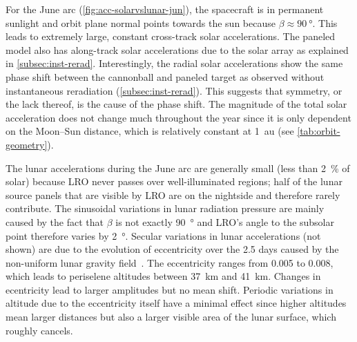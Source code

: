For the June arc (\cref{fig:acc-solarvslunar-jun}), the spacecraft is in permanent sunlight and orbit plane normal points towards the sun because $\beta \approx \qty{90}{\degree}$. This leads to extremely large, constant cross-track solar accelerations. The paneled model also has along-track solar accelerations due to the solar array as explained in \cref{subsec:inst-rerad}. Interestingly, the radial solar accelerations show the same phase shift between the cannonball and paneled target as observed without instantaneous reradiation (\cref{subsec:inst-rerad}). This suggests that symmetry, or the lack thereof, is the cause of the phase shift. The magnitude of the total solar acceleration does not change much throughout the year since it is only dependent on the Moon--Sun distance, which is relatively constant at \qty{1}{\astronomicalunit} (see \cref{tab:orbit-geometry}).

The lunar accelerations during the June arc are generally small (less than \qty{2}{\percent} of solar) because \gls{LRO} never passes over well-illuminated regions; half of the lunar source panels that are visible by \gls{LRO} are on the nightside and therefore rarely contribute. The sinusoidal variations in lunar radiation pressure are mainly caused by the fact that $\beta$ is not exactly \qty{90}{\degree} and \gls{LRO}'s angle to the subsolar point therefore varies by \qty{2}{\degree}. Secular variations in lunar accelerations (not shown) are due to the evolution of eccentricity over the 2.5 days caused by the non-uniform lunar gravity field~\cite{Tooley2010}. The eccentricity ranges from 0.005 to 0.008, which leads to periselene altitudes between \qty{37}{\km} and \qty{41}{\km}. Changes in ecentricity lead to larger amplitudes but no mean shift. Periodic variations in altitude due to the eccentricity itself have a minimal effect since higher altitudes mean larger distances but also a larger visible area of the lunar surface, which roughly cancels.

